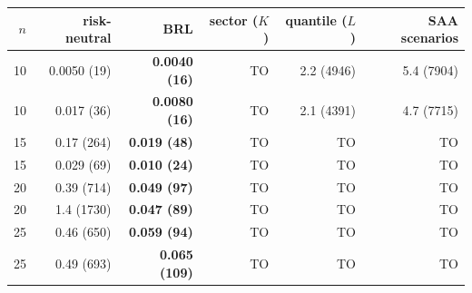 \begin{tabular}{rrrrrr}
\toprule
$n$ & risk-neutral & BRL & sector ($K$) & quantile ($L$) & SAA scenarios \\
\midrule
10 & 0.0050 (19) & \textbf{0.0040 (16)} & TO & 2.2 (4946) & 5.4 (7904) \\
10 & 0.017 (36) & \textbf{0.0080 (16)} & TO & 2.1 (4391) & 4.7 (7715) \\
15 & 0.17 (264) & \textbf{0.019 (48)} & TO & TO & TO \\
15 & 0.029 (69) & \textbf{0.010 (24)} & TO & TO & TO \\
20 & 0.39 (714) & \textbf{0.049 (97)} & TO & TO & TO \\
20 & 1.4 (1730) & \textbf{0.047 (89)} & TO & TO & TO \\
25 & 0.46 (650) & \textbf{0.059 (94)} & TO & TO & TO \\
25 & 0.49 (693) & \textbf{0.065 (109)} & TO & TO & TO \\
\bottomrule
\end{tabular}
